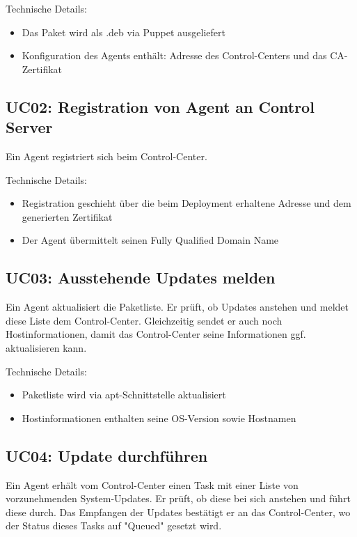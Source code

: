 Technische Details:

\begin{itemize}
    \item Das Paket wird als .deb via Puppet ausgeliefert
    \item Konfiguration des Agents enthält: Adresse des Control-Centers und das CA-Zertifikat
\end{itemize}


\subsection*{UC02: Registration von Agent an Control Server}
\label{sec:uc_02}

Ein Agent registriert sich beim Control-Center.

Technische Details:

\begin{itemize}
    \item Registration geschieht über die beim Deployment erhaltene Adresse und dem generierten Zertifikat
    \item Der Agent übermittelt seinen Fully Qualified Domain Name
\end{itemize}

\subsection*{UC03: Ausstehende Updates melden}
\label{sec:uc_03}

Ein Agent aktualisiert die Paketliste. Er prüft, ob Updates anstehen und meldet diese Liste dem Control-Center. Gleichzeitig sendet er auch noch Hostinformationen, damit das Control-Center seine Informationen ggf. aktualisieren kann.
 

Technische Details:

\begin{itemize}
    \item Paketliste wird via apt-Schnittstelle aktualisiert
    \item Hostinformationen enthalten seine OS-Version sowie Hostnamen
\end{itemize}

\subsection*{UC04: Update durchführen}
\label{sec:uc_04}

Ein Agent erhält vom Control-Center einen Task mit einer Liste von vorzunehmenden System-Updates. Er prüft, ob diese bei sich anstehen und führt diese durch. Das Empfangen der Updates bestätigt er an das Control-Center, wo der Status dieses Tasks auf "Queued" gesetzt wird.

